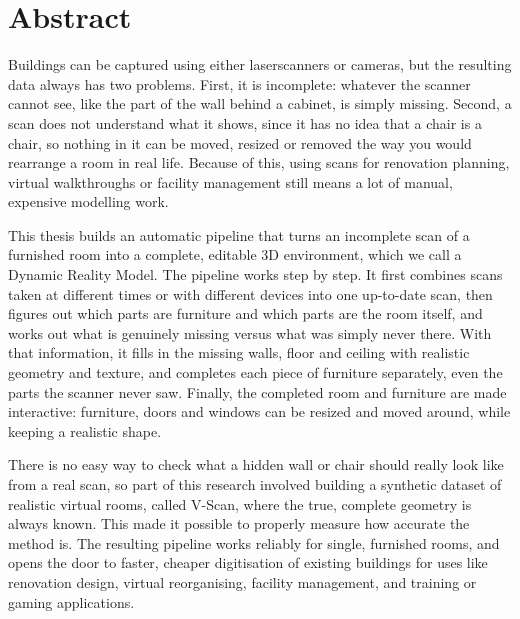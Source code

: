 
\chapter*{Abstract}                                 \label{ch:pop_abstract}

Buildings can be captured using either laserscanners or cameras, but the resulting data always has two problems. First, it is incomplete: whatever the scanner cannot see, like the part of the wall behind a cabinet, is simply missing. Second, a scan does not understand what it shows, since it has no idea that a chair is a chair, so nothing in it can be moved, resized or removed the way you would rearrange a room in real life. Because of this, using scans for renovation planning, virtual walkthroughs or facility management still means a lot of manual, expensive modelling work.

This thesis builds an automatic pipeline that turns an incomplete scan of a furnished room into a complete, editable 3D environment, which we call a Dynamic Reality Model. The pipeline works step by step. It first combines scans taken at different times or with different devices into one up-to-date scan, then figures out which parts are furniture and which parts are the room itself, and works out what is genuinely missing versus what was simply never there. With that information, it fills in the missing walls, floor and ceiling with realistic geometry and texture, and completes each piece of furniture separately, even the parts the scanner never saw. Finally, the completed room and furniture are made interactive: furniture, doors and windows can be resized and moved around, while keeping a realistic shape.

There is no easy way to check what a hidden wall or chair should really look like from a real scan, so part of this research involved building a synthetic dataset of realistic virtual rooms, called V-Scan, where the true, complete geometry is always known. This made it possible to properly measure how accurate the method is. The resulting pipeline works reliably for single, furnished rooms, and opens the door to faster, cheaper digitisation of existing buildings for uses like renovation design, virtual reorganising, facility management, and training or gaming applications.



\cleardoublepage

